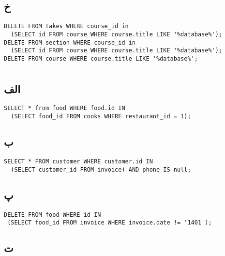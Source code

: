 \documentclass[a4paper]{article}
\begin{document}
\subsection*{خ}
\begin{latin}
\begin{lstlisting}
DELETE FROM takes WHERE course_id in
  (SELECT id FROM course WHERE course.title LIKE '%database%');
DELETE FROM section WHERE course_id in
  (SELECT id FROM course WHERE course.title LIKE '%database%');
DELETE FROM course WHERE course.title LIKE '%database%';
\end{lstlisting}
\end{latin}


\section{}

\subsection*{الف}

\begin{latin}
\begin{lstlisting}
SELECT * from food WHERE food.id IN
  (SELECT food_id FROM cooks WHERE restaurant_id = 1);
\end{lstlisting}
\end{latin}


\subsection*{ب}

\begin{latin}
\begin{lstlisting}
SELECT * FROM customer WHERE customer.id IN 
  (SELECT customer_id FROM invoice) AND phone IS null;
\end{lstlisting}
\end{latin}

\subsection*{پ}
\begin{latin}
\begin{lstlisting}
DELETE FROM food WHERE id IN
 (SELECT food_id FROM invoice WHERE invoice.date != '1401');
\end{lstlisting}
\end{latin}

\subsection*{ت}
\end{document}
